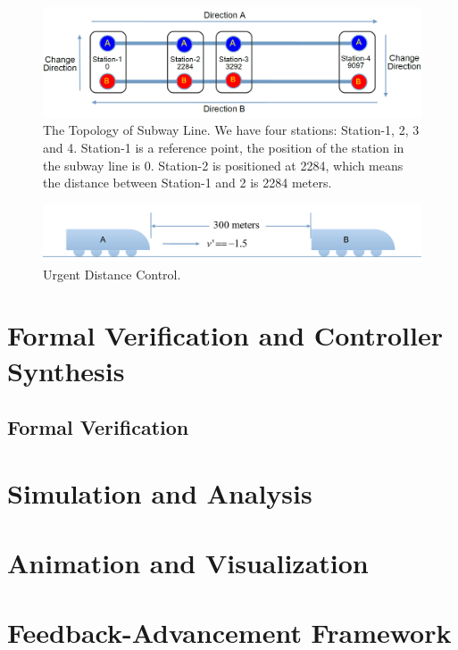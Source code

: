 \documentclass{WileySix}
\begin{document}
\begin{figure}
\centering
\includegraphics[width=0.8\linewidth]{./figs/sbwl}
\caption[The Topology of Subway Line]{The Topology of Subway Line. We have four stations: Station-1, 2, 3 and 4. Station-1 is a reference point, the position of the station in the subway line is 0. Station-2 is positioned at 2284, which means the distance between Station-1 and 2 is 2284 meters.}
\label{fig:sbwl}
\end{figure}

\begin{figure}
\centering
\includegraphics[width=0.8\linewidth]{./figs/distance}
\caption{Urgent Distance Control.}
\label{fig:distance}
\end{figure}


\part[Verification and Synthesis]{Formal Verification and Controller Synthesis}

\chapter{Formal Verification}

\part[Simulation and Analysis]{Simulation and Analysis}

\part[Animation and Visualization]{Animation and Visualization}

\part[Feedback-Advancement Framework]{Feedback-Advancement Framework}
\end{document}

